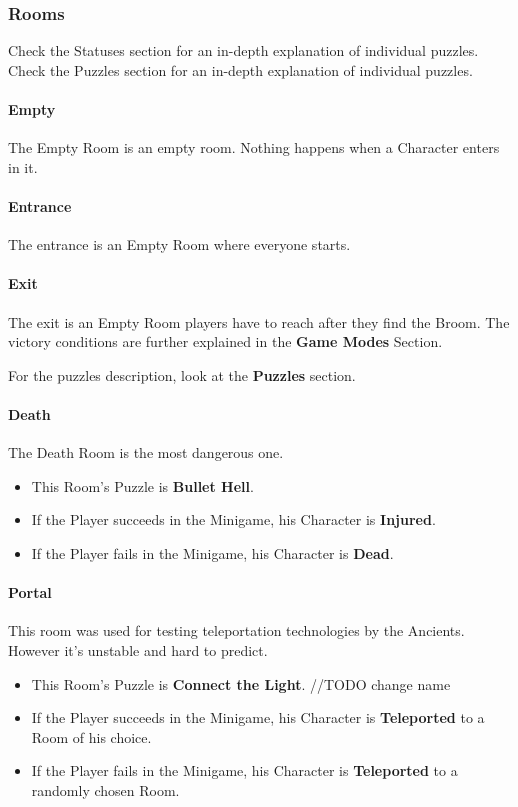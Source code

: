 \subsubsection{Rooms}

Check the Statuses section for an in-depth explanation of individual puzzles.
Check the Puzzles section for an in-depth explanation of individual puzzles.

\paragraph{Empty} The Empty Room is an empty room. Nothing happens when a Character enters in it.

\paragraph{Entrance} The entrance is an Empty Room where everyone starts.

\paragraph{Exit} The exit is an Empty Room players have to reach after they find the Broom. The victory conditions are further explained in the \textbf{Game Modes} Section.

For the puzzles description, look at the \textbf{Puzzles} section.

\paragraph{Death} The Death Room is the most dangerous one.
\begin{itemize}
	\item This Room's Puzzle is \textbf{Bullet Hell}.
	\item If the Player succeeds in the Minigame, his Character is \textbf{Injured}.
	\item If the Player fails    in the Minigame, his Character is \textbf{Dead}.
\end{itemize}

\paragraph{Portal} This room was used for testing teleportation technologies by the Ancients. However it's unstable and hard to predict.
\begin{itemize}
	\item This Room's Puzzle is \textbf{Connect the Light}. //TODO change name
	\item If the Player succeeds in the Minigame, his Character is \textbf{Teleported} to a Room of his choice.
	\item If the Player fails    in the Minigame, his Character is \textbf{Teleported} to a randomly chosen Room.
\end{itemize}

